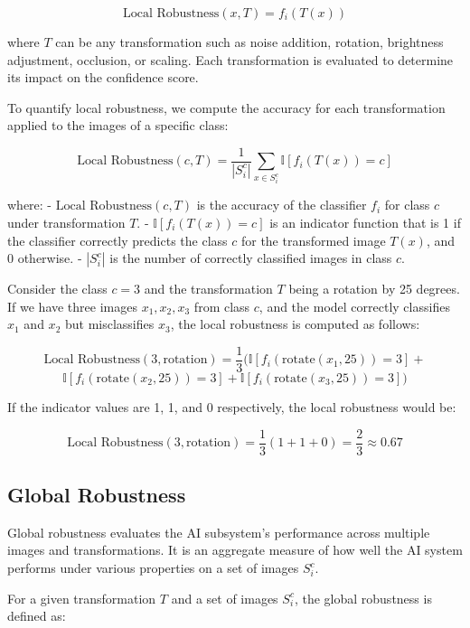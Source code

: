 \[ \text{Local Robustness}(x, T) = f_i(T(x)) \]

where \( T \) can be any transformation such as noise addition, rotation, brightness adjustment, occlusion, or scaling. Each transformation is evaluated to determine its impact on the confidence score.

To quantify local robustness, we compute the accuracy for each transformation applied to the images of a specific class:

\[
\text{Local Robustness}(c, T) = \frac{1}{|S_i^c|} \sum_{x \in S_i^c} \mathbb{I}[f_i(T(x)) = c]
\]

where:
- \(\text{Local Robustness}(c, T)\) is the accuracy of the classifier \( f_i \) for class \( c \) under transformation \( T \).
- \( \mathbb{I}[f_i(T(x)) = c] \) is an indicator function that is 1 if the classifier correctly predicts the class \( c \) for the transformed image \( T(x) \), and 0 otherwise.
- \(|S_i^c|\) is the number of correctly classified images in class \( c \).

\begin{example}
Consider the class \( c = 3 \) and the transformation \( T \) being a rotation by 25 degrees. If we have three images \( x_1, x_2, x_3 \) from class \( c \), and the model correctly classifies \( x_1 \) and \( x_2 \) but misclassifies \( x_3 \), the local robustness is computed as follows:

\[
\text{Local Robustness}(3, \text{rotation}) = \frac{1}{3} (\mathbb{I}[f_i(\text{rotate}(x_1, 25)) = 3] + 
\]
\[
\mathbb{I}[f_i(\text{rotate}(x_2, 25)) = 3] + \mathbb{I}[f_i(\text{rotate}(x_3, 25)) = 3])
\]


If the indicator values are 1, 1, and 0 respectively, the local robustness would be:

\[
\text{Local Robustness}(3, \text{rotation}) = \frac{1}{3} (1 + 1 + 0) = \frac{2}{3} \approx 0.67
\]
\end{example}

\subsection{Global Robustness}

Global robustness evaluates the AI subsystem's performance across multiple images and transformations. It is an aggregate measure of how well the AI system performs under various properties on a set of images $S_i^c$.

For a given transformation $T$ and a set of images $S_i^c$, the global robustness is defined as:

